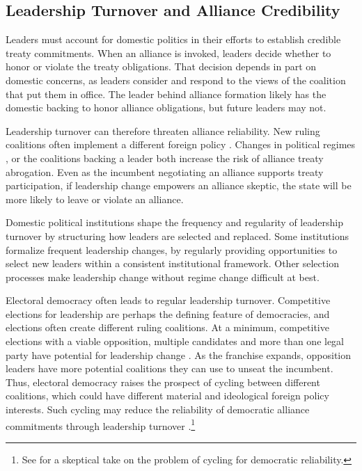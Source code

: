 \documentclass[12pt]{article}
\begin{document}
\subsection{Leadership Turnover and Alliance Credibility}


Leaders must account for domestic politics in their efforts to establish credible treaty commitments.
When an alliance is invoked, leaders decide whether to honor or violate the treaty obligations. 
That decision depends in part on domestic concerns, as leaders consider and respond to the views of the coalition that put them in office. 
The leader behind alliance formation likely has the domestic backing to honor alliance obligations, but future leaders may not. 


Leadership turnover can therefore threaten alliance reliability.
New ruling coalitions often implement a different foreign policy \citep{Lobell2004, Narizny2007}.  
Changes in political regimes \citep{LeedsSavun2007}, or the coalitions backing a leader \citep{Leedsetal2009} both increase the risk of alliance treaty abrogation. 
Even as the incumbent negotiating an alliance supports treaty participation, if leadership change empowers an alliance skeptic, the state will be more likely to leave or violate an alliance.  


Domestic political institutions shape the frequency and regularity of leadership turnover by structuring how leaders are selected and replaced. 
Some institutions formalize frequent leadership changes, by regularly providing opportunities to select new leaders within a consistent institutional framework. 
Other selection processes make leadership change without regime change difficult at best. 


Electoral democracy often leads to regular leadership turnover. 
Competitive elections for leadership are perhaps the defining feature of democracies, and elections often create different ruling coalitions. 
At a minimum, competitive elections with a viable opposition, multiple candidates and more than one legal party have potential for leadership change \citep{HydeMarinov2012}. 
As the franchise expands, opposition leaders have more potential coalitions they can use to unseat the incumbent.  
Thus, electoral democracy raises the prospect of cycling between different coalitions, which could have different material and ideological foreign policy interests. 
Such cycling may reduce the reliability of democratic alliance commitments through leadership turnover \citep{GartzkeGleditsch2004}.\footnote{See \citet{Gaubatz1996} for a skeptical take on the problem of cycling for democratic reliability.}
\end{document}
